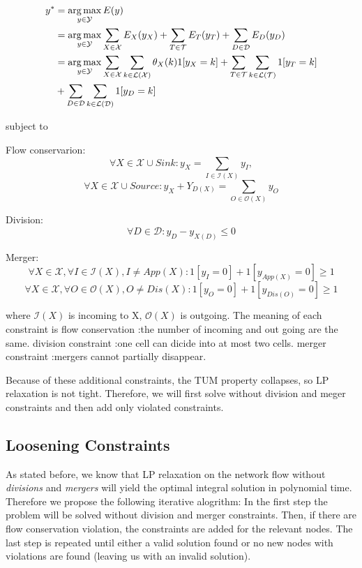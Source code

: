 \documentclass[10pt,twocolumn,letterpaper]{article}
\begin{document}
\begin{scriptsize}
\begin{equation*}
\begin{split}
 y^* &= \operatorname*{arg\,max}_{y\in\mathcal{Y}} E(y) \\ 
     &= \operatorname*{arg\,max}_{y\in\mathcal{Y}} \sum\limits_{X\in\mathcal{X}} E_X(y_X) + \sum\limits_{T\in\mathcal{T}} E_T(y_T) + \sum\limits_{D\in\mathcal{D}} E_D(y_D) \\
     &= \operatorname*{arg\,max}_{y\in\mathcal{Y}} \sum\limits_{X\in\mathcal{X}} \sum\limits_{k\in\mathcal{L(X)}} \theta_X(k) 1[y_X = k] + \sum\limits_{T\in\mathcal{T}} \sum\limits_{k\in\mathcal{L(T)}} 1[y_T = k] \newline \\
     & + \sum\limits_{D\in\mathcal{D}} \sum\limits_{k\in\mathcal{L(D)}} 1[y_D = k] 
\end{split}
\end{equation*}

subject to

Flow conservarion:
\[
\forall X\in\mathcal{X} \cup Sink : y_{X} = \sum\limits_{I\in\mathcal{I}(X)}y_{I}, 
\]
\[
\forall X\in\mathcal{X} \cup Source : y_{X} + Y_{D(X)} = \sum\limits_{O\in\mathcal{O}(X)}y_{O}
\]

Division:
\[
\forall D\in\mathcal{D} : y_{D} - y_{X(D)} \leq 0
\]

Merger:
\[
\forall X\in\mathcal{X}, \forall I\in\mathcal{I}(X),I \neq App(X) : 1[y_{I}=0]+1[y_{App(X)}=0] \geq 1
\]
\[
\forall X\in\mathcal{X}, \forall O\in\mathcal{O}(X),O \neq Dis(X) : 1[y_{O}=0]+1[y_{Dis(O)}=0] \geq 1
\]
\end{scriptsize}

where $\mathcal{I}(X)$ is incoming to X, $\mathcal{O}(X)$ is outgoing. The meaning of each constraint is
flow conservation :the number of incoming and out going are the same.
division constraint :one cell can dicide into at most two cells.
merger constraint :mergers cannot partially disappear.

Because of these additional constraints, the TUM property collapses, so LP relaxation is not tight.
Therefore, we will first solve without division and meger constraints and then add only violated constraints.

\subsection{Loosening Constraints}

As stated before, we know that LP relaxation on the network flow without \textit{divisions} and \textit{mergers} will yield the optimal integral solution in polynomial time. Therefore we propose the following iterative alogrithm: In the first step the problem will be solved without division and merger constraints. Then, if there are flow conservation violation, the constraints are added for the relevant nodes. The last step is repeated until either a valid solution found or no new nodes with violations are found (leaving us with an invalid solution).
\end{document}
